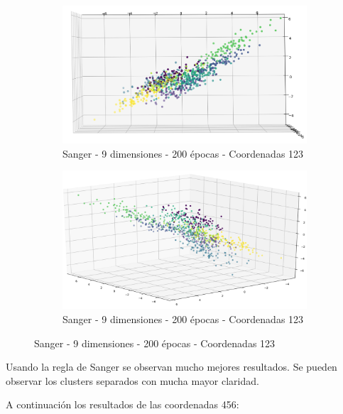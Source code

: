 \begin{figure}[!htbp]
\centering
\begin{subfigure}{.5\textwidth}
  \centering
  \includegraphics[width=1\linewidth, scale=1]{../img/ej1/sanger_corrida_200_9/sanger_9salida_200ep_testing_dim123_3.png}
  \caption{Sanger - 9 dimensiones - 200 épocas - Coordenadas 123}
  \label{fig:sub1}
\end{subfigure}%
\begin{subfigure}{.5\textwidth}
  \centering
  \includegraphics[width=1\linewidth, scale=1]{../img/ej1/sanger_corrida_200_9/sanger_9salida_200ep_testing_dim123_4.png}
  \caption{Sanger - 9 dimensiones - 200 épocas - Coordenadas 123}
  \label{fig:sub2}
\end{subfigure}
\end{figure}

Usando la regla de Sanger se observan mucho mejores resultados. Se pueden observar los clusters separados con mucha mayor claridad. 

A continuación los resultados de las coordenadas 456:

